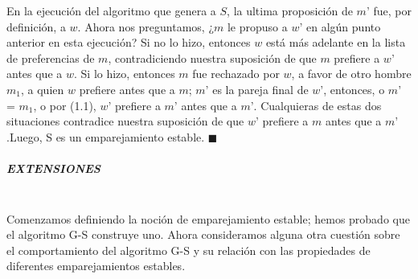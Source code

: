\documentclass[a4paper]{article}
\begin{document}
En la ejecución del algoritmo que genera a $S$, la ultima proposición de $m’$ fue, por definición, a $w$. Ahora nos preguntamos, ¿$m$ le propuso a $w’$ en algún punto anterior en esta ejecución? Si no lo hizo, entonces $w$ está más adelante en la lista de preferencias de $m$, contradiciendo nuestra suposición de que $m$ prefiere a $w’$ antes que a $w$. Si lo hizo, entonces $m$ fue rechazado por $w$, a favor de otro hombre $m_1$, a quien $w$ prefiere antes que a $m$; $m’$ es la pareja final de $w’$, entonces, o $m’$ = $m_1$, o por (1.1), $w’$ prefiere a $m’$ antes que a $m’$. Cualquieras de estas dos situaciones contradice nuestra suposición de que $w’$ prefiere a $m$ antes que a $m’$.Luego, S es un emparejamiento estable.    $ \blacksquare $ 
\subparagraph{EXTENSIONES} ~\\

Comenzamos definiendo la noción de emparejamiento estable; hemos probado que el algoritmo G-S  construye uno. Ahora consideramos alguna  otra cuestión sobre el comportamiento del algoritmo G-S y su relación con las propiedades de diferentes emparejamientos estables.\\
\end{document}
